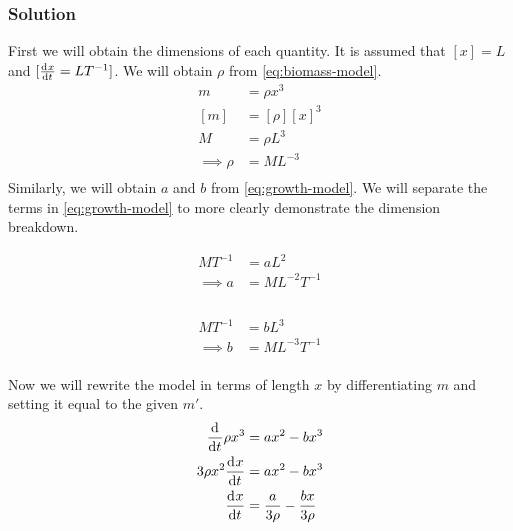 \documentclass[12pt]{article}
\begin{document}
\subsubsection*{Solution}
First we will obtain the dimensions of each quantity. It is assumed that $[x]=L$
and $[\frac{\mathrm{d}^{} {x}}{\mathrm{d}{t}^{}}=LT^{-1}]$. We will obtain $\rho$ from \cref{eq:biomass-model}.
\begin{equation}
  \begin{aligned}
    m &= \rho x^3 \\
    [m] &= [\rho] [x]^3 \\
    M &= \rho L^3 \\
    \implies \rho &= ML^{-3} \\
  \end{aligned}
\end{equation}
Similarly, we will obtain $a$ and $b$ from \cref{eq:growth-model}. We will
separate the terms in \cref{eq:growth-model} to more clearly demonstrate the
dimension breakdown.
\vspace{-2em}
\begin{multicols}{2}
  \begin{equation}
    \begin{aligned}
      MT^{-1} &= aL^2 \\
      \implies a &= ML^{-2}T^{-1} \\
    \end{aligned}
  \end{equation} \\
  \begin{equation}
    \begin{aligned}
      MT^{-1} &= bL^3 \\
      \implies b &= ML^{-3}T^{-1} \\
    \end{aligned}
  \end{equation}
\end{multicols}
Now we will rewrite the model in terms of length $x$ by differentiating $m$ and
setting it equal to the given $m'$.
\begin{equation}
  \begin{aligned}
    \label{eq:model-in-terms-of-x}
    \frac{\mathrm{d}^{} {}}{\mathrm{d}{t}^{}}\rho x^3 &= ax^2-bx^3 \\
    3\rho x^2\frac{\mathrm{d}^{} {x}}{\mathrm{d}{t}^{}} &= ax^2-bx^3 \\
    \frac{\mathrm{d}^{} {x}}{\mathrm{d}{t}^{}} &= \frac{a}{3\rho} - \frac{bx}{3\rho} \\
  \end{aligned}
\end{equation}
\end{document}
